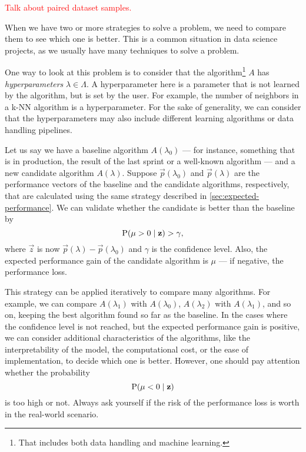 \textcolor{red}{Talk about paired dataset samples.}

When we have two or more strategies to solve a problem, we need to compare them to see
which one is better.  This is a common situation in data science projects, as we usually
have many techniques to solve a problem.

One way to look at this problem is to consider that the algorithm\footnote{That includes
both data handling and machine learning.} $A$ has \emph{hyperparameters} $\lambda \in
\Lambda$.  A hyperparameter here is a parameter that is not learned by the algorithm, but
is set by the user.  For example, the number of neighbors in a k-NN algorithm is a
hyperparameter.  For the sake of generality, we can consider that the hyperparameters may
also include different learning algorithms or data handling pipelines.

Let us say we have a baseline algorithm $A(\lambda_0)$ --- for instance, something that is
in production, the result of the last sprint or a well-known algorithm --- and a new candidate algorithm $A(\lambda)$.
Suppose $\vec{p}(\lambda_0)$ and $\vec{p}(\lambda)$ are the performance vectors of the
baseline and the candidate algorithms, respectively, that are calculated using the same
strategy described in \cref{sec:expected-performance}.  We can validate whether the
candidate is better than the baseline by
\begin{equation*}
  \operatorname{P}(\mu > 0 \mid \mathbf{z}) > \gamma\text{,}
\end{equation*}
where $\vec{z}$ is now $\vec{p}(\lambda) - \vec{p}(\lambda_0)$ and $\gamma$ is the confidence
level.  Also, the expected performance gain of the candidate algorithm is $\mu$ --- if
negative, the performance loss.

This strategy can be applied iteratively to compare many algorithms.  For example, we can
compare $A(\lambda_1)$ with $A(\lambda_0)$, $A(\lambda_2)$ with $A(\lambda_1)$, and so on,
keeping the best algorithm found so far as the baseline. In the cases where the confidence
level is not reached, but the expected performance gain is positive, we can consider
additional characteristics of the algorithms, like the interpretability of the model, the
computational cost, or the ease of implementation, to decide which one is better. However,
one should pay attention whether the probability
\begin{equation*}
  \operatorname{P}(\mu < 0 \mid \mathbf{z})
\end{equation*}
is too high or not.  Always ask yourself if the risk of the performance loss is worth in
the real-world scenario.

